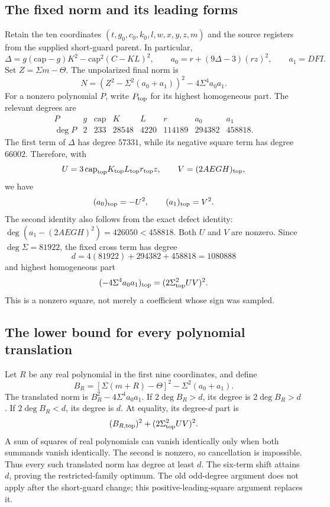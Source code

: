 \subsection{The fixed norm and its leading forms}
Retain the ten coordinates $(t,g_0,c_0,k_0,l,w,x,y,z,m)$ and the source
registers from the supplied short-guard parent. In particular,
\[
 \Delta=g(\mathrm{cap}-g)K^2-\mathrm{cap}^2(C-KL)^2,
 \qquad a_0=r+(9\Delta-3)(rz)^2,\qquad a_1=DFI.
\]
Set $Z=\Sigma m-\Theta$. The unpolarized final norm is
\[
 N=(Z^2-\Sigma^2(a_0+a_1))^2-4\Sigma^4a_0a_1.
\]
For a nonzero polynomial $P$, write $P_{\rm top}$ for its highest
homogeneous part. The relevant degrees are
\[
\begin{array}{c|rrrrrrr}
 P&g&\mathrm{cap}&K&L&r&a_0&a_1\\\hline
 \deg P&2&233&28548&4220&114189&294382&458818.
\end{array}
\]
The first term of $\Delta$ has degree $57331$, while its negative square
term has degree $66002$. Therefore, with
\[
 U=3\,\mathrm{cap}_{\rm top}K_{\rm top}L_{\rm top}r_{\rm top}z,
 \qquad V=(2AEGH)_{\rm top},
\]
we have
\[
 (a_0)_{\rm top}=-U^2,\qquad (a_1)_{\rm top}=V^2.
\]
The second identity also follows from the exact defect identity:
$\deg(a_1-(2AEGH)^2)=426050<458818$. Both $U$ and $V$ are nonzero.
Since $\deg\Sigma=81922$, the fixed cross term has degree
\[
 d=4(81922)+294382+458818=1080888
\]
and highest homogeneous part
\[
 (-4\Sigma^4a_0a_1)_{\rm top}=(2\Sigma_{\rm top}^{2}UV)^2.
\]
This is a nonzero square, not merely a coefficient whose sign was sampled.

\subsection{The lower bound for every polynomial translation}
Let $R$ be any real polynomial in the first nine coordinates, and define
\[
 B_R=[\Sigma(m+R)-\Theta]^2-\Sigma^2(a_0+a_1).
\]
The translated norm is $B_R^2-4\Sigma^4a_0a_1$. If
$2\deg B_R>d$, its degree is $2\deg B_R>d$. If $2\deg B_R<d$, its
degree is $d$. At equality, its degree-$d$ part is
\[
 (B_{R,\rm top})^2+(2\Sigma_{\rm top}^{2}UV)^2.
\]
A sum of squares of real polynomials can vanish identically only when
both summands vanish identically. The second is nonzero, so cancellation
is impossible. Thus every such translated norm has degree at least $d$.
The six-term shift attains $d$, proving the restricted-family optimum.
The old odd-degree argument does not apply after the short-guard change;
this positive-leading-square argument replaces it.

